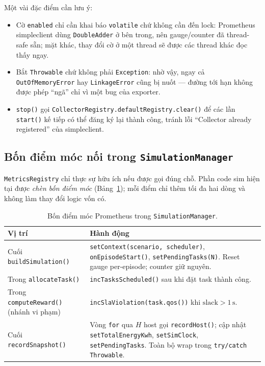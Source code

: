 Một vài đặc điểm cần lưu ý:

\begin{itemize}
  \item Cờ \texttt{enabled} chỉ cần khai báo \texttt{volatile}
        chứ không cần đến lock: Prometheus simpleclient dùng
        \texttt{DoubleAdder} ở bên trong, nên gauge/counter đã
        thread-safe sẵn; mặt khác, thay đổi cờ ở một thread sẽ
        được các thread khác đọc thấy ngay.
  \item Bắt \texttt{Throwable} chứ không phải \texttt{Exception}:
        nhờ vậy, ngay cả \texttt{OutOfMemoryError} hay
        \texttt{LinkageError} cũng bị nuốt --- đường tới hạn
        không được phép ``ngã'' chỉ vì một bug của exporter.
  \item \texttt{stop()} gọi
        \texttt{CollectorRegistry.defaultRegistry.clear()} để
        các lần \texttt{start()} kế tiếp có thể đăng ký lại
        thành công, tránh lỗi ``Collector already registered''
        của simpleclient.
\end{itemize}

\subsection{Bốn điểm móc nối trong \texttt{SimulationManager}}
\texttt{MetricsRegistry} chỉ thực sự hữu ích nếu được gọi đúng chỗ.
Phần code sim hiện tại được \emph{chèn bốn điểm móc}
(Bảng~\ref{tab:hook-points}); mỗi điểm chỉ thêm tối đa hai dòng và
không làm thay đổi logic vốn có.

\begin{table}[H]
  \centering
  \caption{Bốn điểm móc Prometheus trong \texttt{SimulationManager}.}
  \label{tab:hook-points}
  \footnotesize
  \begin{tabularx}{\linewidth}{l X}
    \toprule
    \textbf{Vị trí} & \textbf{Hành động} \\
    \midrule
    Cuối \texttt{buildSimulation()}
        & \texttt{setContext(scenario, scheduler)},
          \texttt{onEpisodeStart()}, \texttt{setPendingTasks(N)}. Reset
          gauge per-episode; counter giữ nguyên. \\
    Trong \texttt{allocateTask()}
        & \texttt{incTasksScheduled()} sau khi đặt task thành công. \\
    Trong \texttt{computeReward()} (nhánh vi phạm)
        & \texttt{incSlaViolation(task.qos())} khi
          $\text{slack} > 1\,\text{s}$. \\
    Cuối \texttt{recordSnapshot()}
        & Vòng \texttt{for} qua $H$ host gọi \texttt{recordHost()};
          cập nhật \texttt{setTotalEnergyKwh}, \texttt{setSimClock},
          \texttt{setPendingTasks}. Toàn bộ wrap trong \texttt{try/catch
          Throwable}. \\
    \bottomrule
  \end{tabularx}
\end{table}

